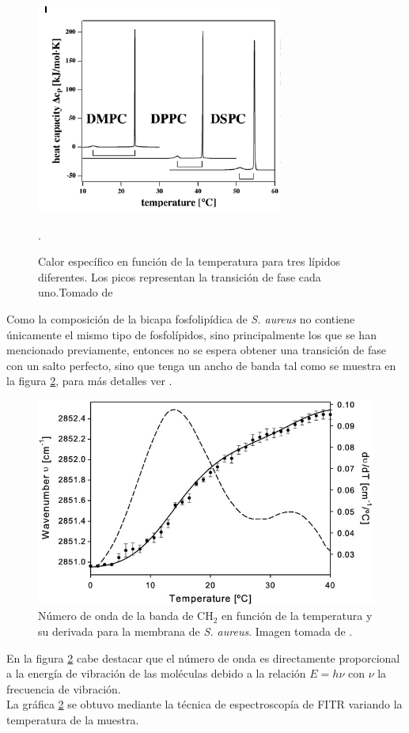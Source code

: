 \documentclass[%
 reprint,
 amsmath,amssymb,
 aps,
]{revtex4-1}
\begin{document}
\begin{figure}[h]
  \includegraphics[width=\linewidth]{cp.png}
  \caption{ Calor específico en función de la temperatura para tres lípidos diferentes. Los picos representan la transición de fase cada uno.Tomado de \cite{Heimburg}}.
  \label{fig:esp3}
\end{figure}
 Como la composición de la bicapa fosfolipídica de \textit{S. aureus} no contiene únicamente el mismo tipo de fosfolípidos, sino principalmente los que se han mencionado previamente, entonces no se espera obtener una transición de fase con un salto perfecto, sino que tenga un ancho de banda tal como se muestra en la figura \ref{fig:ent2}, para más detalles ver \cite{Ocampo2010TheAureus}.\\
\begin{figure}[h]
  \includegraphics[scale=0.3]{transicion.png}
  \caption{ Número de onda de la banda de CH$_{2}$ en función de la temperatura y su derivada para la membrana de \textit{S. aureus}. Imagen tomada de \cite{Ocampo2010TheAureus}.}
  \label{fig:ent2}
\end{figure}
En la figura \ref{fig:ent2} cabe destacar que el número de onda es directamente proporcional a la energía de vibración de las moléculas debido a la relación $E=h\nu$ con $\nu$ la frecuencia de vibración.\\
La gráfica \ref{fig:ent2} se obtuvo mediante la técnica de espectroscopía de FITR variando la temperatura de la muestra.
\end{document}
